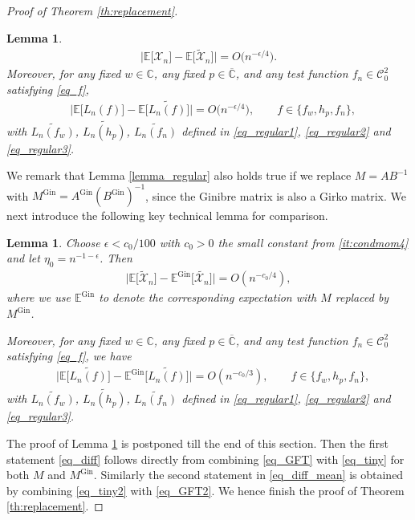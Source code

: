 \documentclass[10pt,reqno]{amsart}
\numberwithin{equation}{section}
\numberwithin{figure}{section}
\theoremstyle{plain}
\newtheorem{lemma}[theorem]{Lemma}
\newcommand{\C}{{\mathbb{C}}}
\newcommand{\wt}{\widetilde}
\newcommand{\<}{\langle}
\renewcommand{\>}{\rangle}
\newcommand{\AG}{A^{\mathrm{Gin}}}
\newcommand{\BG}{B^{\mathrm{Gin}}}
\newcommand{\MG}{M^{\mathrm{Gin}}}
\newcommand{\E}{\mathbb{E}}
\begin{document}
\begin{proof}[Proof of Theorem \ref{th:replacement}]
\begin{lemma}
\begin{align}
\Big|\mathbb{E} \big[ \mathcal{X}_n \big] -\mathbb{E} \big[ \wt{\mathcal{X}}_n \big]  \Big|=O\big( n^{-\epsilon/4}\big).
\end{align}
Moreover, for any fixed $w\in \C$, any fixed $p\in \overline{\C}$, and any test function $f_n\in \mathcal{C}_0^2$ satisfying \eqref{eq_f}, 
    \begin{align}
    &\Big|\mathbb{E} \big[ {L_n(f)} \big] -\mathbb{E} \big[ \wt{L_n(f)}  \big]  \Big|=O\big( n^{-\epsilon/4}\big), \qquad f \in \big\{ f_{w}, h_{p}, f_{n}\big\},\label{eq_tiny2}
%
    \end{align}
    with $\wt{L_n(f_w)}$, $\wt{L_n(h_p)}$, $\wt{L_n(f_n)}$  defined in \eqref{eq_regular1}, \eqref{eq_regular2} and \eqref{eq_regular3}.
\end{lemma}


We remark that Lemma \ref{lemma_regular} also holds true if we replace $M=AB^{-1}$ with $\MG=\AG(\BG)^{-1}$, since the Ginibre matrix is also a Girko matrix. We next introduce the following key technical lemma for comparison.



 \begin{lemma}\label{lemma_GFT}
Choose $\epsilon<c_0/100$ with $c_0>0$ the small constant from \ref{it:condmom4} and let $\eta_0=n^{-1-\epsilon}$.  Then 
	\begin{align}\label{eq_GFT}
		\Big|\mathbb{E} \big[ \wt{\mathcal{X}}_n \big] -\mathbb{E}^{\mathrm{Gin}} \big[ \wt{\mathcal{X}_n} \big]  \Big|=O(n^{-c_0/4}),
	\end{align} 
    where we use $\E^{\mathrm{Gin}}$ to denote the corresponding expectation with $M$ replaced by $M^{\mathrm{Gin}}$.

Moreover, for any fixed $w\in \C$, any fixed $p\in \overline{\C}$, and any test function $f_n\in \mathcal{C}_0^2$ satisfying \eqref{eq_f}, we  have
    \begin{align}
    &\Big|\mathbb{E} \big[ \wt{L_n(f)} \big] -\mathbb{E}^{\mathrm{Gin}} \big[ \wt{L_n(f)} \big]  \Big|=O(n^{-c_0/3}), \qquad f \in \big\{ f_{w}, h_{p}, f_{n}\big\},\label{eq_GFT2}
%
    \end{align}
      with $\wt{L_n(f_w)}$, $\wt{L_n(h_p)}$, $\wt{L_n(f_n)}$  defined in \eqref{eq_regular1}, \eqref{eq_regular2} and \eqref{eq_regular3}.
\end{lemma}


The proof of Lemma \ref{lemma_GFT} is postponed till the end of this section. Then the first statement \eqref{eq_diff} follows directly from combining \eqref{eq_GFT} with \eqref{eq_tiny} for both $M$ and $M^{\mathrm{Gin}}$. Similarly the second statement in \eqref{eq_diff_mean} is obtained by combining \eqref{eq_tiny2} with \eqref{eq_GFT2}.  We hence finish the proof of Theorem \ref{th:replacement}.
 \end{proof}
%
%
%
\end{document}
